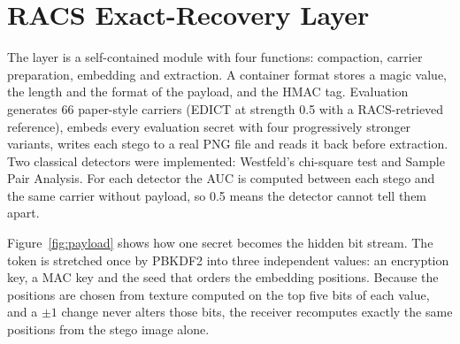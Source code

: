 \section{RACS Exact-Recovery Layer}
The layer is a self-contained module with four functions: compaction,
carrier preparation, embedding and extraction. A container
format stores a magic value, the length and the format of the payload, and the HMAC tag.
Evaluation generates 66 paper-style carriers (EDICT at strength 0.5 with a RACS-retrieved
reference), embeds every evaluation secret with four progressively stronger variants, writes each
stego to a real PNG file and reads it back before extraction. Two classical detectors were
implemented: Westfeld's chi-square test and Sample Pair Analysis. For each detector the AUC is
computed between each stego and the same carrier without payload, so 0.5 means the detector cannot
tell them apart.

Figure~\ref{fig:payload} shows how one secret becomes the hidden bit stream. The token is
stretched once by PBKDF2 into three independent values: an encryption key, a MAC key and the seed
that orders the embedding positions. Because the positions are chosen from texture computed on the
top five bits of each value, and a $\pm1$ change never alters those bits, the receiver recomputes
exactly the same positions from the stego image alone.

